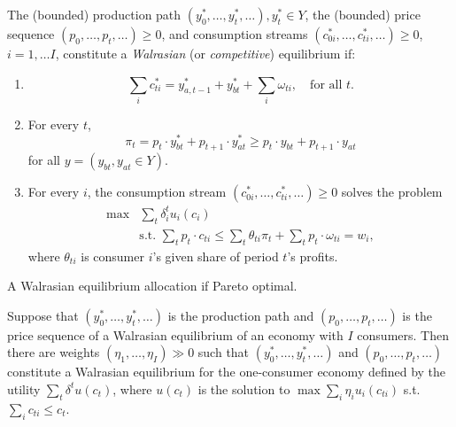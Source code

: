 \begin{defn}
    The (bounded) production path $(y^*_0, \dots, y^*_t, \dots), y^*_t \in Y$, the (bounded) price sequence $(p_0, \dots, p_t, \dots) \geq 0$, and consumption streams $(c^*_{0i}, \dots, c^*_{ti}, \dots) \geq 0$, $i = 1, \dots I$, constitute a \emph{Walrasian} (or \emph{competitive}) equilibrium if:
    \begin{enumerate}
        \item 
        \begin{equation*}
            \sum_i c^*_{ti} = y^*_{a, t - 1} + y^*_{bt} + \sum_i \omega_{ti}, \quad \text{for all } t.
        \end{equation*}

        \item 
        For every $t$,
        \begin{equation*}
            \pi_t = p_t \cdot y^*_{bt} + p_{t + 1} \cdot y^*_{at} \geq p_t \cdot y_{bt} + p_{t + 1} \cdot y_{at}
        \end{equation*}
        for all $y = (y_{bt}, y_{at} \in Y)$.

        \item 
        For every $i$, the consumption stream $(c^*_{0i}, \dots, c^*_{ti}, \dots) \geq 0$ solves the problem
        \begin{equation*}
            \begin{aligned}
                \max &\sum_t \delta^t_i u_i(c_i) \\
                &\text{s.t. } \sum_t p_t \cdot c_{ti} \leq \sum_t \theta_{ti} \pi_t + \sum_t p_t \cdot \omega_{ti} = w_i,
            \end{aligned}
        \end{equation*}
        where $\theta_{ti}$ is consumer $i$'s given share of period $t$'s profits.
    \end{enumerate}
\end{defn}

\begin{prop}
    A Walrasian equilibrium allocation if Pareto optimal.
\end{prop}

\begin{prop}
    Suppose that $(y^*_0, \dots, y^*_t, \dots)$ is the production path and $(p_0, \dots, p_t, \dots)$ is the price sequence of a Walrasian equilibrium of an economy with $I$ consumers. Then there are weights $(\eta_1, \dots, \eta_I) \gg 0$ such that $(y^*_0, \dots, y^*_t, \dots)$ and $(p_0, \dots, p_t, \dots)$ constitute a Walrasian equilibrium for the one-consumer economy defined by the utility $\sum_t \delta^t u(c_t)$, where $u(c_t)$ is the solution to $\max \sum_i \eta_i u_i(c_{ti})$ s.t. $\sum_i c_{ti} \leq c_t$.
\end{prop}


